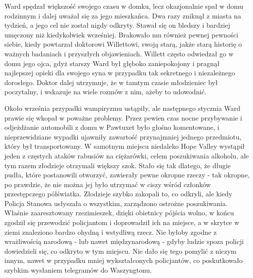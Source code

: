 Ward spędzał większość swojego czasu w domku, lecz okazjonalnie spał w domu rodzinnym i dalej uważał się za jego mieszkańca. Dwa razy zniknął z miasta na tydzień, a jego cel nie został nigdy odkryty. Stawał się on bledszy i bardziej umęczony niż kiedykolwiek wcześniej. Brakowało mu również pewnej pewności siebie, kiedy powtarzał doktorowi Willettowi, swoją starą, jakże starą historię o ważnych badaniach i przyszłych objawieniach. Willett często odwiedzał go w domu jego ojca, gdyż starszy Ward był głęboko zaniepokojony i pragnął najlepszej opieki dla swojego syna w przypadku tak sekretnego i niezależnego dorosłego. Doktor dalej utrzymuje, że w tamtym czasie młodzieniec był poczytalny, i wskazuje na wiele rozmów z nim, ażeby to udowodnić. 

Około września przypadki wampiryzmu ustąpiły, ale następnego stycznia Ward prawie się wkopał w poważne problemy. Przez pewien czas nocne przybywanie i odjeżdżanie automobili z domu w Pawtuxet było głośno komentowane, i nieprzewidziane wypadki ujawniły zawartość przynajmniej jednego przedmiotu, który był transportowany. W samotnym miejscu niedaleko Hope Valley wystąpił jeden z częstych ataków rabusiów na ciężarówki, celem poszukiwania alkoholu, ale tym razem złodzieje otrzymali większy szok. Stało się tak dlatego, że długie pudła, które postanowili otworzyć, zawierały pewne okropne rzeczy - tak okropne, po prawdzie, że nie można jej było utrzymać w ciszy wśród członków przestępczego półświatka. Złodzieje szybko zakopali to, co odkryli, ale kiedy Policja Stanowa usłyszała o wszystkim, zarządzono ostrożne poszukiwania. Właśnie zaaresztowany rzezimieszek, dzięki obietnicy pójścia wolno, w końcu zgodził się przewodzić policjantom i doprowadził ich na miejsce, a w skrytce w ziemi znaleziono bardzo ohydną i wstydliwą rzecz. Nie byłoby zgodne z wrażliwością narodową - lub nawet międzynarodową - gdyby ludzie spoza policji dowiedzieli się, co odkryto w tym miejscu. Nie dało się tego pomylić z niczym innym, nawet w przypadku mniej wykształconych policjantów, co poskutkowało szybkim wysłaniem telegramów do Waszyngtonu. 

